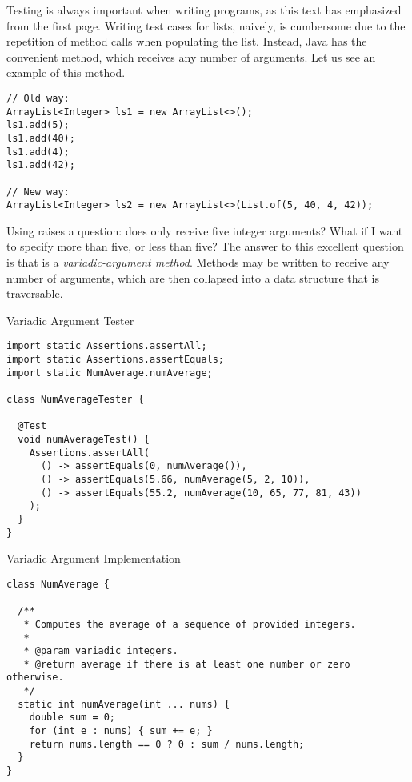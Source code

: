 Testing is always important when writing programs, as this text has emphasized from the first page. Writing test cases for lists, naively, is cumbersome due to the repetition of  method calls when populating the list. Instead, Java has the convenient  method, which receives any number of arguments. Let us see an example of this method.

\begin{verbatim}
// Old way:
ArrayList<Integer> ls1 = new ArrayList<>();
ls1.add(5);
ls1.add(40);
ls1.add(4);
ls1.add(42);

// New way:
ArrayList<Integer> ls2 = new ArrayList<>(List.of(5, 40, 4, 42));
\end{verbatim}
Using  raises a question: does  only receive five integer arguments? What if I want to specify more than five, or less than five? The answer to this excellent question is that  is a \textit{variadic-argument method}. Methods may be written to receive any number of arguments, which are then collapsed into a data structure that is traversable.


\begin{cl}[]{Variadic Argument  Tester}
\begin{lstlisting}[language=MyJava]
import static Assertions.assertAll;
import static Assertions.assertEquals;
import static NumAverage.numAverage;

class NumAverageTester {

  @Test
  void numAverageTest() {
    Assertions.assertAll(
      () -> assertEquals(0, numAverage()),
      () -> assertEquals(5.66, numAverage(5, 2, 10)),
      () -> assertEquals(55.2, numAverage(10, 65, 77, 81, 43))
    );
  }
}
\end{lstlisting}
\end{cl}

\begin{cl}[]{Variadic Argument  Implementation}
\begin{lstlisting}[language=MyJava]
class NumAverage {

  /**
   * Computes the average of a sequence of provided integers.
   *
   * @param variadic integers.
   * @return average if there is at least one number or zero otherwise.
   */
  static int numAverage(int ... nums) {
    double sum = 0;
    for (int e : nums) { sum += e; }
    return nums.length == 0 ? 0 : sum / nums.length;
  }
}
\end{lstlisting}
\end{cl}

